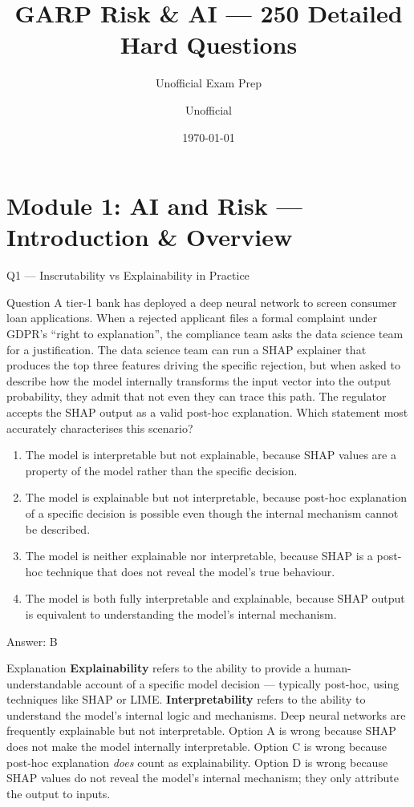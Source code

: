 \documentclass[aspectratio=169,8pt]{beamer}
\title[GARP RAI]{GARP Risk \& AI --- 250 Detailed Hard Questions}
\subtitle{Unofficial Exam Prep}
\author{Unofficial}
\date{\today}
\begin{document}
	\begin{frame}\titlepage\end{frame}
	
	\section{Module 1: AI and Risk --- Introduction \& Overview}
	
	\begin{frame}{Q1 --- Inscrutability vs Explainability in Practice}
		\begin{block}{Question}
			A tier-1 bank has deployed a deep neural network to screen consumer loan applications. When a rejected applicant files a formal complaint under GDPR's ``right to explanation'', the compliance team asks the data science team for a justification. The data science team can run a SHAP explainer that produces the top three features driving the specific rejection, but when asked to describe how the model internally transforms the input vector into the output probability, they admit that not even they can trace this path. The regulator accepts the SHAP output as a valid post-hoc explanation. Which statement most accurately characterises this scenario?
		\end{block}
		\begin{enumerate}
			\item The model is interpretable but not explainable, because SHAP values are a property of the model rather than the specific decision.
			\item The model is explainable but not interpretable, because post-hoc explanation of a specific decision is possible even though the internal mechanism cannot be described.
			\item The model is neither explainable nor interpretable, because SHAP is a post-hoc technique that does not reveal the model's true behaviour.
			\item The model is both fully interpretable and explainable, because SHAP output is equivalent to understanding the model's internal mechanism.
		\end{enumerate}
		\begin{exampleblock}{Answer: B}\end{exampleblock}
		\begin{block}{Explanation}
			\textbf{Explainability} refers to the ability to provide a human-understandable account of a specific model decision --- typically post-hoc, using techniques like SHAP or LIME. \textbf{Interpretability} refers to the ability to understand the model's internal logic and mechanisms. Deep neural networks are frequently explainable but not interpretable. Option A is wrong because SHAP does not make the model internally interpretable. Option C is wrong because post-hoc explanation \emph{does} count as explainability. Option D is wrong because SHAP values do not reveal the model's internal mechanism; they only attribute the output to inputs.
		\end{block}
	\end{frame}
	
\end{document}
